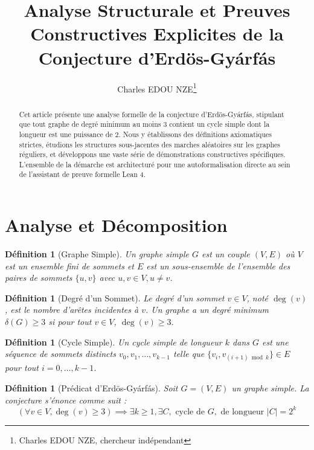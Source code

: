 \documentclass[11pt,a4paper]{article}
\title{Analyse Structurale et Preuves Constructives Explicites de la Conjecture d'Erdös-Gyárfás}
\author{Charles EDOU NZE\thanks{Charles EDOU NZE, chercheur indépendant}}
\date{}
\newtheorem{definition}[theorem]{Définition}
\begin{document}
\maketitle

\begin{abstract}
Cet article présente une analyse formelle de la conjecture d'Erdös-Gyárfás, stipulant que tout graphe de degré minimum au moins 3 contient un cycle simple dont la longueur est une puissance de 2. Nous y établissons des définitions axiomatiques strictes, étudions les structures sous-jacentes des marches aléatoires sur les graphes réguliers, et développons une vaste série de démonstrations constructives spécifiques. L'ensemble de la démarche est architecturé pour une autoformalisation directe au sein de l'assistant de preuve formelle Lean 4.
\end{abstract}

\tableofcontents

\section{Analyse et Décomposition}

\begin{definition}[Graphe Simple]
Un graphe simple $G$ est un couple $(V, E)$ où $V$ est un ensemble fini de sommets et $E$ est un sous-ensemble de l'ensemble des paires de sommets $\{u, v\}$ avec $u, v \in V, u \neq v$.
\end{definition}

\begin{definition}[Degré d'un Sommet]
Le degré d'un sommet $v \in V$, noté $\deg(v)$, est le nombre d'arêtes incidentes à $v$. Un graphe a un degré minimum $\delta(G) \geq 3$ si pour tout $v \in V$, $\deg(v) \geq 3$.
\end{definition}

\begin{definition}[Cycle Simple]
Un cycle simple de longueur $k$ dans $G$ est une séquence de sommets distincts $v_0, v_1, \dots, v_{k-1}$ telle que $\{v_i, v_{(i+1) \bmod k}\} \in E$ pour tout $i = 0, \dots, k-1$.
\end{definition}

\begin{definition}[Prédicat d'Erdös-Gyárfás]
Soit $G = (V, E)$ un graphe simple. La conjecture s'énonce comme suit :
$$ (\forall v \in V, \deg(v) \geq 3) \implies \exists k \geq 1, \exists C, \text{ cycle de } G, \text{ de longueur } |C| = 2^k $$
\end{definition}
\end{document}
